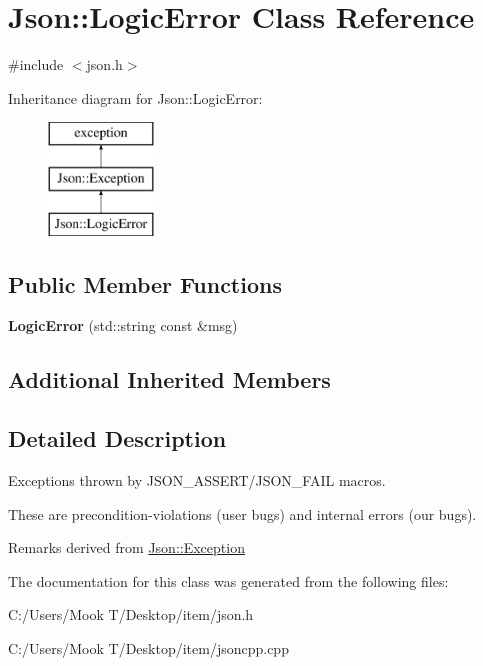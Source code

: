 \hypertarget{class_json_1_1_logic_error}{}\section{Json\+:\+:Logic\+Error Class Reference}
\label{class_json_1_1_logic_error}


{\ttfamily \#include $<$json.\+h$>$}

Inheritance diagram for Json\+:\+:Logic\+Error\+:\begin{figure}[H]
\begin{center}
\leavevmode
\includegraphics[height=3.000000cm]{class_json_1_1_logic_error}
\end{center}
\end{figure}
\subsection*{Public Member Functions}
\begin{DoxyCompactItemize}
\item 
\hypertarget{class_json_1_1_logic_error_ae8a834c790017a55df74c70b91f23329}{}{\bfseries Logic\+Error} (std\+::string const \&msg)\label{class_json_1_1_logic_error_ae8a834c790017a55df74c70b91f23329}

\end{DoxyCompactItemize}
\subsection*{Additional Inherited Members}


\subsection{Detailed Description}
Exceptions thrown by J\+S\+O\+N\+\_\+\+A\+S\+S\+E\+R\+T/\+J\+S\+O\+N\+\_\+\+F\+A\+I\+L macros.

These are precondition-\/violations (user bugs) and internal errors (our bugs).

\begin{DoxyRemark}{Remarks}
derived from \hyperlink{class_json_1_1_exception}{Json\+::\+Exception} 
\end{DoxyRemark}


The documentation for this class was generated from the following files\+:\begin{DoxyCompactItemize}
\item 
C\+:/\+Users/\+Mook T/\+Desktop/item/json.\+h\item 
C\+:/\+Users/\+Mook T/\+Desktop/item/jsoncpp.\+cpp\end{DoxyCompactItemize}
